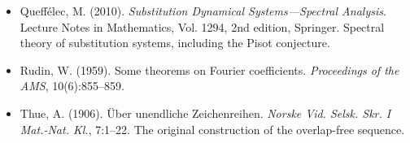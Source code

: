 \begin{itemize}
  \item Queffélec, M. (2010). \textit{Substitution Dynamical Systems---Spectral Analysis}. Lecture Notes in Mathematics, Vol. 1294, 2nd edition, Springer. Spectral theory of substitution systems, including the Pisot conjecture.
\end{itemize}

\begin{itemize}
  \item Rudin, W. (1959). Some theorems on Fourier coefficients. \textit{Proceedings of the AMS}, 10(6):855--859.
\end{itemize}

\begin{itemize}
  \item Thue, A. (1906). Über unendliche Zeichenreihen. \textit{Norske Vid. Selsk. Skr. I Mat.-Nat. Kl.}, 7:1--22. The original construction of the overlap-free sequence.
\end{itemize}
